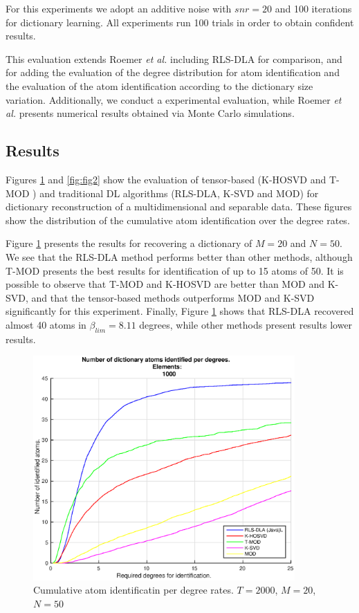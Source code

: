For this experiments we adopt an additive noise with $snr = 20$ and 100 iterations for dictionary learning. All experiments run 100 trials in order to obtain confident results.

This evaluation extends Roemer \emph{et al.} \cite{roemer2014tensor} including RLS-DLA for comparison, and for adding the evaluation of the degree distribution for atom identification and the evaluation of the atom identification according to the dictionary size variation. Additionally, we conduct a experimental evaluation, while Roemer \emph{et al.} \cite{roemer2014tensor} presents numerical results obtained via Monte Carlo simulations.


\subsection{Results}
\label{sec:4_motivation_results}

Figures \ref{fig:fig1} and \ref{fig:fig2} show the evaluation of tensor-based (K-HOSVD \cite{roemer2014tensor} and T-MOD \cite{roemer2014tensor}) and traditional DL algorithms (RLS-DLA, K-SVD and MOD) for dictionary reconstruction of a multidimensional and separable data. These figures show the distribution of the cumulative atom identification over the degree rates.

Figure \ref{fig:fig1} presents the results for recovering a dictionary of $M=20$ and $N=50$. We see that the RLS-DLA method performs better than other methods, although T-MOD presents the best results for identification of up to 15 atoms of 50. It is possible to observe that T-MOD and K-HOSVD are better than MOD and K-SVD, and that the tensor-based methods outperforms MOD and K-SVD significantly for this experiment. Finally, Figure \ref{fig:fig1} shows that RLS-DLA recovered almost 40 atoms in $\beta_{lim} = 8.11$ degrees, while other methods present results lower results.

\begin{figure}[!htb]
     \centering 
	 \includegraphics[width=10cm]{figures/5_20_2000_1000_100.eps}
     \caption{Cumulative atom identificatin per degree rates. $T=2000$, $M=20$, $N=50$}
     \label{fig:fig1}
\end{figure}

